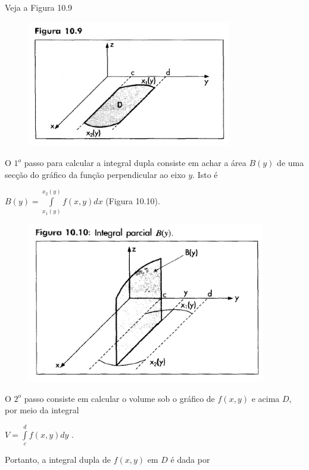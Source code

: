 			\medskip

			Veja a Figura 10.9

			\begin{figure}[H]
				\includegraphics[height=5.5cm]{images/morettin_figura-10-9}
			\end{figure}

			O $1^{o}$ passo para calcular a integral dupla consiste em achar a área $B(y)$ de uma secção do gráfico da função perpendicular ao eixo $y$. Isto é

			\medskip

			$B(y) = \int \limits^{x_{2}(y)}_{x_{1}(y)} f(x, y)dx$ (Figura 10.10).

			\begin{figure}[H]
				\includegraphics[height=7cm]{images/morettin_figura-10-10}
			\end{figure}

			O $2^{o}$ passo consiste em calcular o volume sob o gráfico de $f(x, y)$ e acima $D$, por meio da integral

			\medskip

			$V = \int \limits^{d}_{c} f(x, y)dy$ .

			\medskip

			Portanto, a integral dupla de $f(x, y)$ em $D$ é dada por

			\medskip


